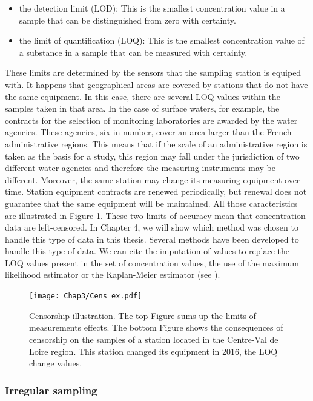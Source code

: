 \begin{itemize}
    \item the detection limit (LOD): This is the smallest concentration value in a sample that can be distinguished from zero with certainty.
    \item the limit of quantification (LOQ): This is the smallest concentration value of a substance in a sample that can be measured with certainty. 
\end{itemize}

These limits are determined by the sensors that the sampling station is equiped with. It happens that geographical areas are covered by stations that do not have the same equipment. In this case, there are several LOQ values within the samples taken in that area. In the case of surface waters, for example, the contracts for the selection of monitoring laboratories are awarded by the water agencies. These agencies, six in number, cover an area larger than the French administrative regions. This means that if the scale of an administrative region is taken as the basis for a study, this region may fall under the jurisdiction of two different water agencies and therefore the measuring instruments may be different. Moreover, the same station may change its measuring equipment over time. Station equipment contracts are renewed periodically, but renewal does not guarantee that the same equipment will be maintained. All those caracteristics are illustrated in Figure \ref{fig:cens_ex}. These two limits of accuracy mean that concentration data are left-censored. In Chapter 4, we will show which method was chosen to handle this type of data in this thesis. Several methods have been developed to handle this type of data. We can cite the imputation of values to replace the LOQ values present in the set of concentration values, the use of the maximum likelihood estimator or the Kaplan-Meier estimator (see \cite{Gillaizeau2020,Croghan2003MethodsOD}). 

\begin{figure}
    \centering
    \texttt{[image: Chap3/Cens\_ex.pdf]}
    \caption{Censorship illustration. The top Figure sums up the limits of measurements effects. The bottom Figure shows the consequences of censorship on the samples of a station located in the Centre-Val de Loire region. This station changed its equipment in 2016, the LOQ change values.}
    \label{fig:cens_ex}
\end{figure}

\subsubsection{Irregular sampling}

